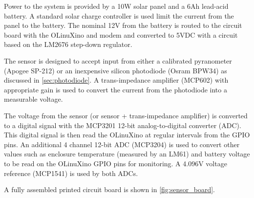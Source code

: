 Power to the system is provided by a 10W solar panel and a 6Ah
lead-acid battery.
A standard solar charge controller is used limit the current from the
panel to the battery.
The nominal 12V from the battery is routed to the circuit board with
the OLinuXino and modem and converted to 5VDC with a circuit based on
the LM2676 step-down regulator.

The sensor is designed to accept input from either a calibrated
pyranometer (Apogee SP-212) or an inexpensive silicon photodiode
(Osram BPW34) as discussed in \cref{sec:photodiode}.
A trans-impedance amplifier (MCP602) with appropriate gain is used to
convert the current from the photodiode into a measurable voltage.

The voltage from the sensor (or sensor + trans-impedance amplifier) is
converted to a digital signal with the MCP3201 12-bit
analog-to-digital converter (ADC).
This digital signal is then read the OLinuXino at regular intervals
from the GPIO pins.
An additional 4 channel 12-bit ADC (MCP3204) is used to convert other
values such as enclosure temperature (measured by an LM61) and battery
voltage to be read on the OLinuXino GPIO pins for monitoring.
A 4.096V voltage reference (MCP1541) is used by both ADCs.

A fully assembled printed circuit board is shown in
\cref{fig:sensor_board}.

